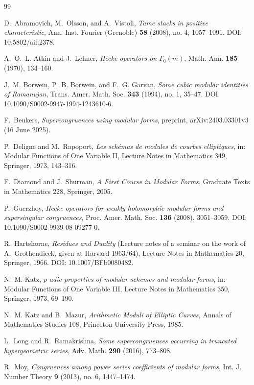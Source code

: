 \documentclass[11pt]{amsart}
\theoremstyle{definition}
\theoremstyle{remark}
\begin{document}
\begin{thebibliography}{99}

D.~Abramovich, M.~Olsson, and A.~Vistoli,
\emph{Tame stacks in positive characteristic},
Ann. Inst. Fourier (Grenoble) \textbf{58} (2008), no. 4, 1057--1091.
DOI: 10.5802/aif.2378.

A.~O.~L. Atkin and J.~Lehner,
\emph{Hecke operators on $\Gamma_0(m)$},
Math. Ann. \textbf{185} (1970), 134--160.

J.~M. Borwein, P.~B. Borwein, and F.~G. Garvan,
\emph{Some cubic modular identities of Ramanujan},
Trans. Amer. Math. Soc. \textbf{343} (1994), no. 1, 35--47.
DOI: 10.1090/S0002-9947-1994-1243610-6.

F.~Beukers,
\emph{Supercongruences using modular forms},
preprint, arXiv:2403.03301v3 (16 June 2025).

P.~Deligne and M.~Rapoport,
\emph{Les sch\'emas de modules de courbes elliptiques}, in:
Modular Functions of One Variable II,
Lecture Notes in Mathematics 349, Springer, 1973, 143--316.

F.~Diamond and J.~Shurman,
\emph{A First Course in Modular Forms},
Graduate Texts in Mathematics 228, Springer, 2005.

P.~Guerzhoy,
\emph{Hecke operators for weakly holomorphic modular forms and supersingular congruences},
Proc. Amer. Math. Soc. \textbf{136} (2008), 3051--3059.
DOI: 10.1090/S0002-9939-08-09277-0.

R.~Hartshorne,
\emph{Residues and Duality} (Lecture notes of a seminar on the work of A.~Grothendieck, given at Harvard 1963/64),
Lecture Notes in Mathematics 20, Springer, 1966.
DOI: 10.1007/BFb0080482.

N.~M. Katz,
\emph{$p$-adic properties of modular schemes and modular forms}, in:
Modular Functions of One Variable III,
Lecture Notes in Mathematics 350, Springer, 1973, 69--190.

N.~M. Katz and B.~Mazur,
\emph{Arithmetic Moduli of Elliptic Curves},
Annals of Mathematics Studies 108, Princeton University Press, 1985.

L.~Long and R.~Ramakrishna,
\emph{Some supercongruences occurring in truncated hypergeometric series},
Adv. Math. \textbf{290} (2016), 773--808.

R.~Moy,
\emph{Congruences among power series coefficients of modular forms},
Int. J. Number Theory \textbf{9} (2013), no. 6, 1447--1474.


\end{thebibliography}
\end{document}
